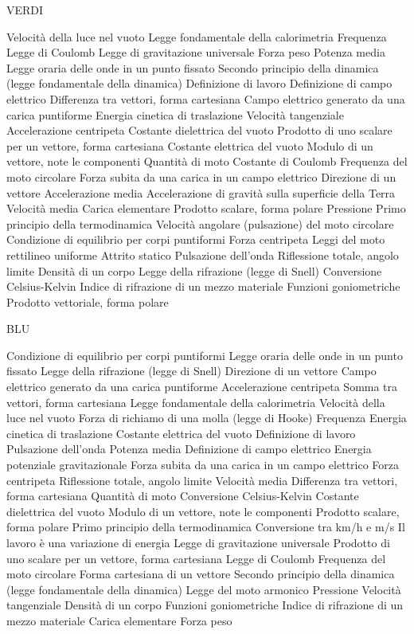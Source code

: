 \documentclass[a4paper,11pt,italian]{article}
\begin{document}
VERDI
\begin{enumerate}
{Velocità della luce nel vuoto}
{Legge fondamentale della calorimetria}
{Frequenza}
{Legge di Coulomb}
{Legge di gravitazione universale}
{Forza peso}
{Potenza media}
{Legge oraria delle onde in un punto fissato}
{Secondo principio della dinamica (legge fondamentale della dinamica)}
{Definizione di lavoro}
{Definizione di campo elettrico}
{Differenza tra vettori, forma cartesiana}
{Campo elettrico generato da una carica puntiforme}
{Energia cinetica di traslazione}
{Velocità tangenziale}
{Accelerazione centripeta}
{Costante dielettrica del vuoto}
{Prodotto di uno scalare per un vettore, forma cartesiana}
{Costante elettrica del vuoto}
{Modulo di un vettore, note le componenti}
{Quantità di moto}
{Costante di Coulomb}
{Frequenza del moto circolare}
{Forza subita da una carica in un campo elettrico}
{Direzione di un vettore}
{Accelerazione media}
{Accelerazione di gravità sulla superficie della Terra}
{Velocità media}
{Carica elementare}
{Prodotto scalare, forma polare}
{Pressione}
{Primo principio della termodinamica}
{Velocità angolare (pulsazione) del moto circolare}
{Condizione di equilibrio per corpi puntiformi}
{Forza centripeta}
{Leggi del moto rettilineo uniforme}
{Attrito statico}
{Pulsazione dell'onda}
{Riflessione totale, angolo limite}
{Densità di un corpo}
{Legge della rifrazione (legge di Snell)}
{Conversione Celsius-Kelvin}
{Indice di rifrazione di un mezzo materiale}
{Funzioni goniometriche}
{Prodotto vettoriale, forma polare}
\end{enumerate}





BLU
\begin{enumerate}
{Condizione di equilibrio per corpi puntiformi}
{Legge oraria delle onde in un punto fissato}
{Legge della rifrazione (legge di Snell)}
{Direzione di un vettore}
{Campo elettrico generato da una carica puntiforme}
{Accelerazione centripeta}
{Somma tra vettori, forma cartesiana}
{Legge fondamentale della calorimetria}
{Velocità della luce nel vuoto}
{Forza di richiamo di una molla (legge di Hooke)}
{Frequenza}
{Energia cinetica di traslazione}
{Costante elettrica del vuoto}
{Definizione di lavoro}
{Pulsazione dell'onda}
{Potenza media}
{Definizione di campo elettrico}
{Energia potenziale gravitazionale}
{Forza subita da una carica in un campo elettrico}
{Forza centripeta}
{Riflessione totale, angolo limite}
{Velocità media}
{Differenza tra vettori, forma cartesiana}
{Quantità di moto}
{Conversione Celsius-Kelvin}
{Costante dielettrica del vuoto}
{Modulo di un vettore, note le componenti}
{Prodotto scalare, forma polare}
{Primo principio della termodinamica}
{Conversione tra km/h e m/s}
{Il lavoro è una variazione di energia}
{Legge di gravitazione universale}
{Prodotto di uno scalare per un vettore, forma cartesiana}
{Legge di Coulomb}
{Frequenza del moto circolare}
{Forma cartesiana di un vettore}
{Secondo principio della dinamica (legge fondamentale della dinamica)}
{Legge del moto armonico}
{Pressione}
{Velocità tangenziale}
{Densità di un corpo}
{Funzioni goniometriche}
{Indice di rifrazione di un mezzo materiale}
{Carica elementare}
{Forza peso}
\end{enumerate}
\end{document}
